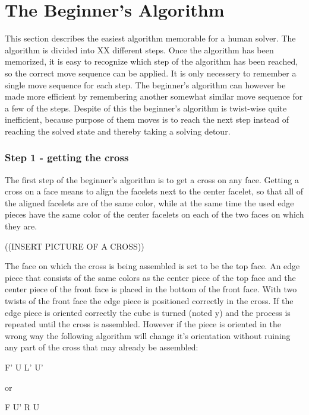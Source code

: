 \chapter{The Beginner's Algorithm}
\label{sec:beginner}

This section describes the easiest algorithm memorable for a human solver. The algorithm is divided into XX different steps. Once the algorithm has been memorized, it is easy to recognize which step of the algorithm has been reached, so the correct move sequence can be applied. It is only necessery to remember a single move sequence for each step. The beginner's algorithm can however be made more efficient by remembering another somewhat similar move sequence for a few of the steps. Despite of this the beginner's algorithm is twist-wise quite inefficient, because purpose of them moves is to reach the next step instead of reaching the solved state and thereby taking a solving detour. 

\subsection{Step 1 - getting the cross}
The first step of the beginner's algorithm is to get a cross on any face. Getting a cross on a face means to align the facelets next to the center facelet, so that all of the aligned facelets are of the same color, while at the same time the used edge pieces have the same color of the center facelets on each of the two faces on which they are.

((INSERT PICTURE OF A CROSS))

The face on which the cross is being assembled is set to be the top face. An edge piece that consists of the same colors as the center piece of the top face and the center piece of the front face is placed in the bottom of the front face. With two twists of the front face the edge piece is positioned correctly in the cross. If the edge piece is oriented correctly the cube is turned (noted y) and the process is repeated until the cross is assembled. However if the piece is oriented in the wrong way the following algorithm will change it's orientation without ruining any part of the cross that may already be assembled:

F' U L' U'

or

F U' R U

